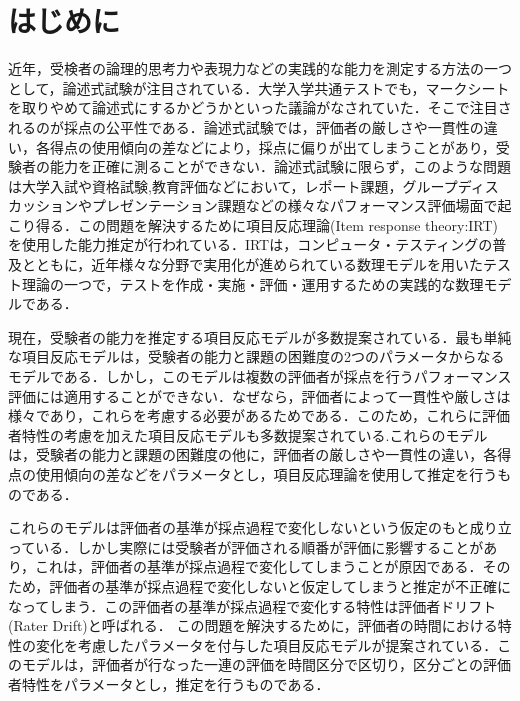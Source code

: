 \documentclass[a4paper,11pt,oneside,openany]{jsbook}
\begin{document}
\newpage
\chapter{はじめに}
近年，受検者の論理的思考力や表現力などの実践的な能力を測定する方法の一つとして，論述式試験が注目されている．大学入学共通テストでも，マークシートを取りやめて論述式にするかどうかといった議論がなされていた．そこで注目されるのが採点の公平性である．論述式試験では，評価者の厳しさや一貫性の違い，各得点の使用傾向の差などにより，採点に偏りが出てしまうことがあり，受験者の能力を正確に測ることができない．論述式試験に限らず，このような問題は大学入試や資格試験,教育評価などにおいて，レポート課題，グループディスカッションやプレゼンテーション課題などの様々なパフォーマンス評価場面で起こり得る．この問題を解決するために項目反応理論(Item response theory:IRT)\cite{IRTtext,IRTLord}を使用した能力推定が行われている．IRTは，コンピュータ・テスティングの普及とともに，近年様々な分野で実用化が進められている数理モデルを用いたテスト理論の一つで，テストを作成・実施・評価・運用するための実践的な数理モデルである．

現在，受験者の能力を推定する項目反応モデルが多数提案されている．最も単純な項目反応モデルは，受験者の能力と課題の困難度の2つのパラメータからなるモデル\cite{rash}である．しかし，このモデルは複数の評価者が採点を行うパフォーマンス評価には適用することができない．なぜなら，評価者によって一貫性や厳しさは様々であり，これらを考慮する必要があるためである．このため，これらに評価者特性の考慮を加えた項目反応モデルも多数提案されている\cite{raterRash,rater2,rater3,raterGPCM}.これらのモデルは，受験者の能力と課題の困難度の他に，評価者の厳しさや一貫性の違い，各得点の使用傾向の差などをパラメータとし，項目反応理論を使用して推定を行うものである．

これらのモデルは評価者の基準が採点過程で変化しないという仮定のもと成り立っている．しかし実際には受験者が評価される順番が評価に影響することがあり，これは，評価者の基準が採点過程で変化してしまうことが原因である．そのため，評価者の基準が採点過程で変化しないと仮定してしまうと推定が不正確になってしまう．この評価者の基準が採点過程で変化する特性は評価者ドリフト(Rater Drift)と呼ばれる．
この問題を解決するために，評価者の時間における特性の変化を考慮したパラメータを付与した項目反応モデルが提案されている\cite{raterdrift}．このモデルは，評価者が行なった一連の評価を時間区分で区切り，区分ごとの評価者特性をパラメータとし，推定を行うものである．
\end{document}
